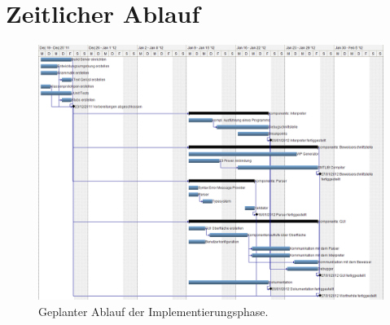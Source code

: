 \section{Zeitlicher Ablauf}

\begin{landscape}%
	\begin{figure}%
		\vspace{-2cm}
		\includegraphics[height=1.2\textheight]{images/gantt_implementierung_diag.png}%
		\caption{Geplanter Ablauf der Implementierungsphase.}%
	\end{figure}%
\end{landscape}
